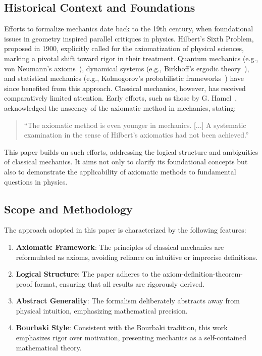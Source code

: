 \documentclass[12pt]{amsart}
\begin{document}
\subsection{Historical Context and Foundations} Efforts to formalize mechanics date back to the 19th century, when foundational issues in geometry inspired parallel critiques in physics. Hilbert's Sixth Problem, proposed in 1900, explicitly called for the axiomatization of physical sciences, marking a pivotal shift toward rigor in their treatment. Quantum mechanics (e.g., von Neumann's axioms~\cite{vonneumann1932}), dynamical systems (e.g., Birkhoff's ergodic theory~\cite{birkhoff1931}), and statistical mechanics (e.g., Kolmogorov's probabilistic frameworks~\cite{kolmogorov1950}) have since benefited from this approach. Classical mechanics, however, has received comparatively limited attention. Early efforts, such as those by G. Hamel~\cite{hamel1909}, acknowledged the nascency of the axiomatic method in mechanics, stating: 
\begin{quote}
    ``The axiomatic method is even younger in mechanics. [...] A systematic examination in the sense of Hilbert's axiomatics had not been achieved.''
\end{quote}

This paper builds on such efforts, addressing the logical structure and ambiguities of classical mechanics. It aims not only to clarify its foundational concepts but also to demonstrate the applicability of axiomatic methods to fundamental questions in physics.

\subsection{Scope and Methodology}
The approach adopted in this paper is characterized by the following features:

\begin{enumerate}
    \item \textbf{Axiomatic Framework}: The principles of classical mechanics are reformulated as axioms, avoiding reliance on intuitive or imprecise definitions.
    \item \textbf{Logical Structure}: The paper adheres to the axiom-definition-theorem-proof format, ensuring that all results are rigorously derived.
    \item \textbf{Abstract Generality}: The formalism deliberately abstracts away from physical intuition, emphasizing mathematical precision.
    \item \textbf{Bourbaki Style}: Consistent with the Bourbaki tradition, this work emphasizes rigor over motivation, presenting mechanics as a self-contained mathematical theory.
\end{enumerate}
\end{document}
